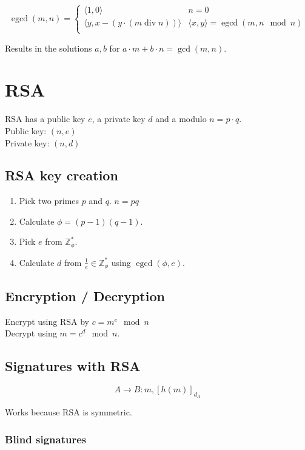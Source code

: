 \documentclass{article}
\newcommand{\Z}{\mathbb{Z}}
\newcommand{\egcd}{\operatorname{egcd}}
\begin{document}
\[
  \egcd(m,n) = \begin{cases}
    \langle 1,0 \rangle & n = 0 \\
    \langle y, x - (y \cdot (m \operatorname{div} n))\rangle & \langle x, y \rangle = \egcd(m, n \mod n) \\
  \end{cases}
\]

Results in the solutions $a,b$ for $a \cdot m + b \cdot n = \gcd(m,n)$.

\section{RSA}

RSA has a public key $e$, a private key $d$ and a modulo $n=p\cdot q$. \\
Public key: $(n, e)$\\
Private key: $(n,d)$ \\

\subsection{RSA key creation}
\begin{enumerate}
  \item Pick two primes $p$ and $q$. $n=pq$
  \item Calculate $\phi = (p-1)(q-1)$.
  \item Pick $e$ from $\Z^*_\phi$.
  \item Calculate $d$ from $\frac{1}{e} \in \Z^*_\phi$ using $\egcd(\phi,e)$.
\end{enumerate}

\subsection{Encryption / Decryption}
Encrypt using RSA by $c = m^e \mod n$\\
Decrypt using $m = c^d \mod n$.

\subsection{Signatures with RSA}

\[
  A \longrightarrow B : m, [h(m)]_{d_A}
\]

Works because RSA is symmetric.

\subsubsection{Blind signatures}
\end{document}
